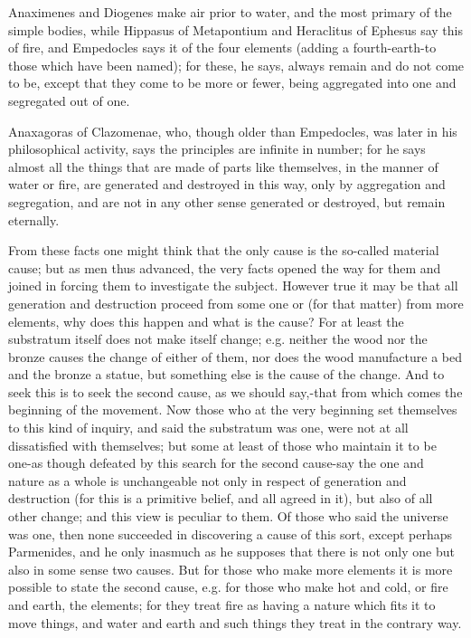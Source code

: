 \documentclass{article}
\begin{document}
Anaximenes and Diogenes make air prior to water, and the most primary of the simple bodies, while Hippasus of Metapontium and Heraclitus of Ephesus say this of fire, and Empedocles says it of the four elements (adding a fourth-earth-to those which have been named); for these, he says, always remain and do not come to be, except that they come to be more or fewer, being aggregated into one and segregated out of one.

Anaxagoras of Clazomenae, who, though older than Empedocles, was later in his philosophical activity, says the principles are infinite in number; for he says almost all the things that are made of parts like themselves, in the manner of water or fire, are generated and destroyed in this way, only by aggregation and segregation, and are not in any other sense generated or destroyed, but remain eternally.

From these facts one might think that the only cause is the so-called material cause; but as men thus advanced, the very facts opened the way for them and joined in forcing them to investigate the subject. However true it may be that all generation and destruction proceed from some one or (for that matter) from more elements, why does this happen and what is the cause? For at least the substratum itself does not make itself change; e.g. neither the wood nor the bronze causes the change of either of them, nor does the wood manufacture a bed and the bronze a statue, but something else is the cause of the change. And to seek this is to seek the second cause, as we should say,-that from which comes the beginning of the movement. Now those who at the very beginning set themselves to this kind of inquiry, and said the substratum was one, were not at all dissatisfied with themselves; but some at least of those who maintain it to be one-as though defeated by this search for the second cause-say the one and nature as a whole is unchangeable not only in respect of generation and destruction (for this is a primitive belief, and all agreed in it), but also of all other change; and this view is peculiar to them. Of those who said the universe was one, then none succeeded in discovering a cause of this sort, except perhaps Parmenides, and he only inasmuch as he supposes that there is not only one but also in some sense two causes. But for those who make more elements it is more possible to state the second cause, e.g. for those who make hot and cold, or fire and earth, the elements; for they treat fire as having a nature which fits it to move things, and water and earth and such things they treat in the contrary way.
\end{document}
